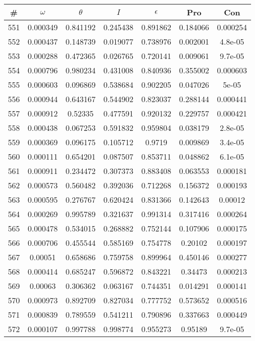 \newpage
\begin{table}
\begin{tabular}{c|c|c|c|c|c|c}
\# & $\omega$ & $\theta$ & $I$ & $\epsilon$ & Pro & Con\\
\hline
551 & 0.000349 & 0.841192 & 0.245438 & 0.891862 & 0.184066 & 0.000254\\
552 & 0.000437 & 0.148739 & 0.019077 & 0.738976 & 0.002001 & 4.8e-05\\
553 & 0.000288 & 0.472365 & 0.026765 & 0.720141 & 0.009061 & 9.7e-05\\
554 & 0.000796 & 0.980234 & 0.431008 & 0.840936 & 0.355002 & 0.000603\\
555 & 0.000603 & 0.096869 & 0.538684 & 0.902205 & 0.047026 & 5e-05\\
556 & 0.000944 & 0.643167 & 0.544902 & 0.823037 & 0.288144 & 0.000441\\
557 & 0.000912 & 0.52335 & 0.477591 & 0.920132 & 0.229757 & 0.000421\\
558 & 0.000438 & 0.067253 & 0.591832 & 0.959804 & 0.038179 & 2.8e-05\\
559 & 0.000369 & 0.096175 & 0.105712 & 0.9719 & 0.009869 & 3.4e-05\\
560 & 0.000111 & 0.654201 & 0.087507 & 0.853711 & 0.048862 & 6.1e-05\\
561 & 0.000911 & 0.234472 & 0.307373 & 0.883408 & 0.063553 & 0.000181\\
562 & 0.000573 & 0.560482 & 0.392036 & 0.712268 & 0.156372 & 0.000193\\
563 & 0.000595 & 0.276767 & 0.620424 & 0.831366 & 0.142643 & 0.00012\\
564 & 0.000269 & 0.995789 & 0.321637 & 0.991314 & 0.317416 & 0.000264\\
565 & 0.000478 & 0.534015 & 0.268882 & 0.752144 & 0.107906 & 0.000175\\
566 & 0.000706 & 0.455544 & 0.585169 & 0.754778 & 0.20102 & 0.000197\\
567 & 0.00051 & 0.658686 & 0.759758 & 0.899964 & 0.450146 & 0.000277\\
568 & 0.000414 & 0.685247 & 0.596872 & 0.843221 & 0.34473 & 0.000213\\
569 & 0.00063 & 0.306362 & 0.063167 & 0.744351 & 0.014291 & 0.000141\\
570 & 0.000973 & 0.892709 & 0.827034 & 0.777752 & 0.573652 & 0.000516\\
571 & 0.000839 & 0.789559 & 0.541211 & 0.790896 & 0.337663 & 0.000449\\
572 & 0.000107 & 0.997788 & 0.998774 & 0.955273 & 0.95189 & 9.7e-05\\

\end{tabular}
\end{table}
